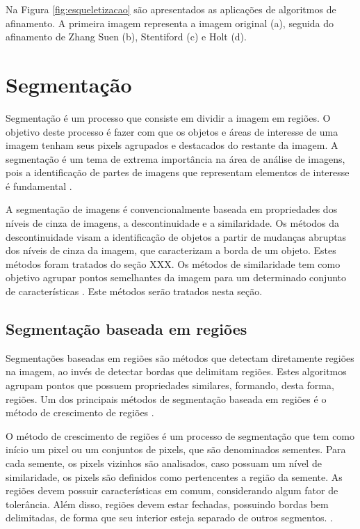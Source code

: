 \documentclass[
	12pt,				%
	oneside,			%
	a4paper,			%
	english,			%
	french,				%
	spanish,			%
	brazil,				%
	]{abntex2}
\begin{document}
Na Figura \ref{fig:esqueletizacao} são apresentados as aplicações de algoritmos de afinamento. A primeira imagem representa a imagem original (a), seguida do afinamento de Zhang Suen (b), Stentiford (c) e Holt (d). 
   
\section{Segmentação}  

Segmentação é um processo que consiste em dividir a imagem em regiões. O objetivo deste processo é fazer com que os objetos e áreas de interesse de uma imagem tenham seus pixels agrupados e destacados do restante da imagem. A segmentação é um tema de extrema importância na área de análise de imagens, pois a identificação de partes de imagens que representam elementos de interesse é fundamental \cite{conciAzevedoLeta:2008}.  

A segmentação de imagens é convencionalmente baseada em propriedades dos níveis de cinza de imagens, a descontinuidade e a similaridade. Os métodos da descontinuidade visam a identificação de objetos a partir de mudanças abruptas dos níveis de cinza da imagem, que caracterizam a borda de um objeto. Estes métodos foram tratados do seção XXX. Os métodos de similaridade tem como objetivo agrupar pontos semelhantes da imagem para um determinado conjunto de características \cite{pedriniSchwartz:2008}. Este métodos serão tratados nesta seção.
    
\subsection{Segmentação baseada em regiões}     

Segmentações baseadas em regiões são métodos que detectam diretamente regiões na imagem, ao invés de detectar bordas que delimitam regiões. Estes algoritmos agrupam pontos que possuem propriedades similares, formando, desta forma, regiões. Um dos principais métodos de segmentação baseada em regiões é o método de crescimento de regiões \cite{pedriniSchwartz:2008}.

O método de crescimento de regiões é um processo de segmentação que tem como início um pixel ou um conjuntos de pixels, que são denominados sementes. Para cada semente, os pixels vizinhos são analisados, caso possuam um nível de similaridade, os pixels são definidos como pertencentes a região da semente. As regiões devem possuir características em comum, considerando algum fator de tolerância. Além disso, regiões devem estar fechadas, possuindo bordas bem delimitadas, de forma que seu interior esteja separado de outros segmentos. \cite{conciAzevedoLeta:2008}.
\end{document}
